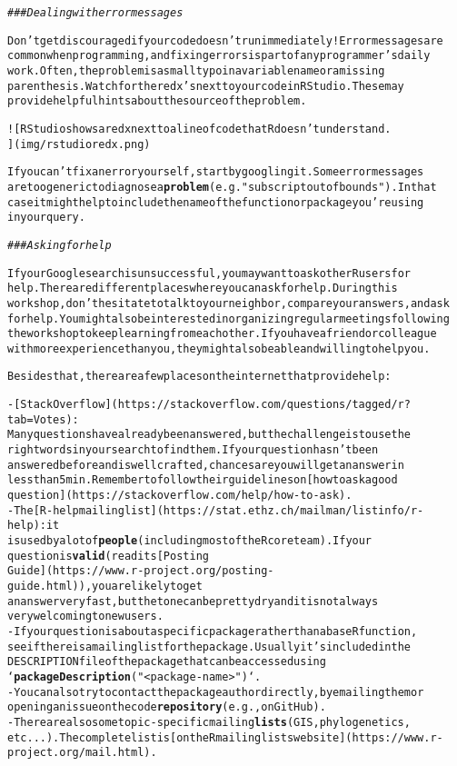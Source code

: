 \documentclass{article}\usepackage[]{graphicx}\usepackage[]{xcolor}
\makeatletter
\newcommand{\hlstr}[1]{\textcolor[rgb]{0.192,0.494,0.8}{#1}}%
\newcommand{\hlcom}[1]{\textcolor[rgb]{0.678,0.584,0.686}{\textit{#1}}}%
\newcommand{\hlkwd}[1]{\textcolor[rgb]{0.737,0.353,0.396}{\textbf{#1}}}%
\newenvironment{kframe}{%
 \def\at@end@of@kframe{}%
 \ifinner\ifhmode%
  \def\at@end@of@kframe{\end{minipage}}%
  \begin{minipage}{\columnwidth}%
 \fi\fi%
 \def\FrameCommand##1{\hskip\@totalleftmargin \hskip-\fboxsep
 \colorbox{shadecolor}{##1}\hskip-\fboxsep
     \hskip-\linewidth \hskip-\@totalleftmargin \hskip\columnwidth}%
 \MakeFramed {\advance\hsize-\width
   \@totalleftmargin\z@ \linewidth\hsize
   \@setminipage}}%
 {\par\unskip\endMakeFramed%
 \at@end@of@kframe}
\newenvironment{knitrout}{}{} %
\makeatother
\begin{document}
\begin{knitrout}
\begin{kframe}
\begin{alltt}
\hlcom{### Dealing with error messages}

Don\hlstr{'t get discouraged if your code doesn'}t run immediately! Error messages are
common when programming, and fixing errors is part of any programmer's daily
work. Often, the problem is a small typo in a variable name or a missing
parenthesis. Watch for the red x's next to your code in RStudio. These may
provide helpful hints about the source of the problem.

![RStudio shows a red x next to a line of code that R doesn't understand.
](img/rstudioredx.png)

If you can't fix an error yourself, start by googling it. Some error messages
are too generic to diagnose a \hlkwd{problem} (e.g. \hlstr{"subscript out of bounds"}). In that
case it might help to include the name of the function or package you're using
in your query.

\hlcom{### Asking for help}

If your Google search is unsuccessful, you may want to ask other R users for
help. There are different places where you can ask for help. During this
workshop, don't hesitate to talk to your neighbor, compare your answers, and ask
for help. You might also be interested in organizing regular meetings following
the workshop to keep learning from each other. If you have a friend or colleague
with more experience than you, they might also be able and willing to help you.

Besides that, there are a few places on the internet that provide help:

-   [Stack Overflow](https://stackoverflow.com/questions/tagged/r?tab=Votes):
    Many questions have already been answered, but the challenge is to use the
    right words in your search to find them. If your question hasn't been
    answered before and is well crafted, chances are you will get an answer in
    less than 5 min. Remember to follow their guidelines on [how to ask a good
    question](https://stackoverflow.com/help/how-to-ask).
-   The [R-help mailing list](https://stat.ethz.ch/mailman/listinfo/r-help): it
    is used by a lot of \hlkwd{people} (including most of the R core team). If your
    question is \hlkwd{valid} (read its [Posting
    Guide](https://www.r-project.org/posting-guide.html)), you are likely to get
    an answer very fast, but the tone can be pretty dry and it is not always
    very welcoming to new users.
-   If your question is about a specific package rather than a base R function,
    see if there is a mailing list for the package. Usually it's included in the
    DESCRIPTION file of the package that can be accessed using
    `\hlkwd{packageDescription}(\hlstr{"<package-name>"})`.
-   You can also try to contact the package author directly, by emailing them or
    opening an issue on the code \hlkwd{repository} (e.g., on GitHub).
-   There are also some topic-specific mailing \hlkwd{lists} (GIS, phylogenetics,
    etc...).  The complete list is [on the R mailing lists website](https://www.r-project.org/mail.html).


\end{alltt}
\end{kframe}
\end{knitrout}
\end{document}
